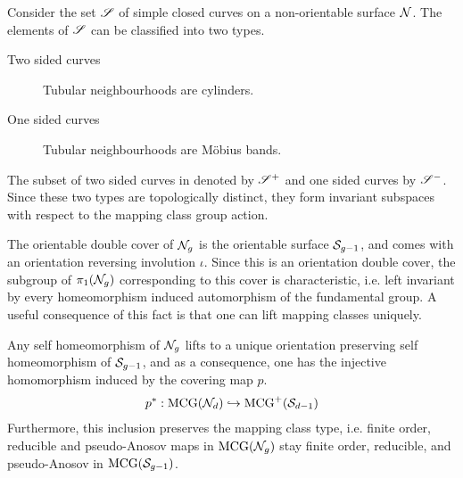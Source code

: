 \documentclass[12pt, reqno]{amsart}
\begin{document}
Consider the set $\mathscr{S}$ of simple closed curves on a non-orientable surface $\mathcal{N}$.
The elements of $\mathscr{S}$ can be classified into two types.
\begin{description}
\item[Two sided curves] Tubular neighbourhoods are cylinders.
\item[One sided curves] Tubular neighbourhoods are Möbius bands.
\end{description}
The subset of two sided curves in denoted by $\mathscr{S}^+$ and one sided curves by $\mathscr{S}^-$.
Since these two types are topologically distinct, they form invariant subspaces with respect to the mapping class group action.

The orientable double cover of $\mathcal{N}_g$ is the orientable surface $\mathcal{S}_{g-1}$, and comes with an orientation reversing involution $\iota$.
Since this is an orientation double cover, the subgroup of $\pi_1(\mathcal{N}_g)$ corresponding to this cover is characteristic, i.e. left invariant by every homeomorphism induced automorphism of the fundamental group.
A useful consequence of this fact is that one can lift mapping classes uniquely.
\begin{fact}
  Any self homeomorphism of $\mathcal{N}_g$ lifts to a unique orientation preserving self homeomorphism of $\mathcal{S}_{g-1}$, and as a consequence, one has the injective homomorphism induced by the covering map $p$.
  \begin{align*}
    p^{\ast}: \mathrm{MCG}(\mathcal{N}_d) \hookrightarrow \mathrm{MCG}^+(\mathcal{S}_{d-1})
  \end{align*}
  Furthermore, this inclusion preserves the mapping class type, i.e. finite order, reducible and pseudo-Anosov maps in $\mathrm{MCG}(\mathcal{N}_g)$ stay finite order, reducible, and pseudo-Anosov in $\mathrm{MCG}(\mathcal{S}_{g-1})$.
\end{fact}
\end{document}

